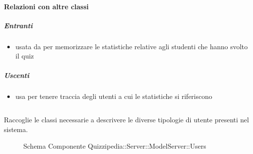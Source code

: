 \paragraph{Relazioni con altre classi}
\subparagraph{Entranti}
\begin{itemize}
\item usata da  per memorizzare le statistiche relative agli studenti che hanno svolto il quiz
\end{itemize}
\subparagraph{Uscenti}
\begin{itemize}
\item usa  per tenere traccia degli utenti a cui le statistiche si riferiscono
\end{itemize}
\subsection{}
Raccoglie le classi necessarie a descrivere le diverse tipologie di utente presenti nel sistema.
\begin{figure}[H]
\centering
\noindent{}
\caption[Schema Componente Quizzipedia::Server::ModelServer::Users]{Schema Componente Quizzipedia::Server::ModelServer::Users}
\end{figure}
